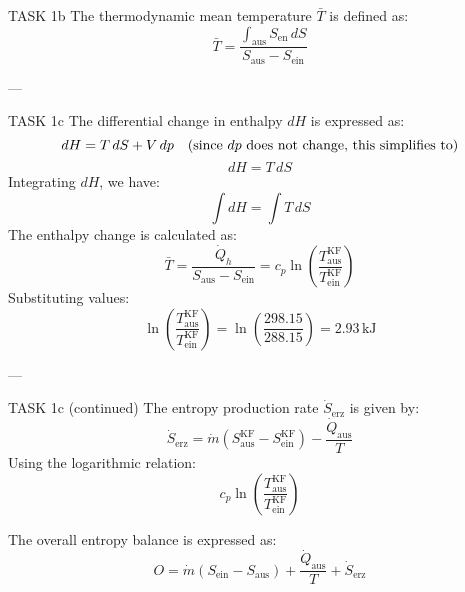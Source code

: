 TASK 1b  
The thermodynamic mean temperature \( \bar{T} \) is defined as:  
\[
\bar{T} = \frac{\int_{\text{aus}} S_{\text{en}} \, dS}{S_{\text{aus}} - S_{\text{ein}}}
\]

---

TASK 1c  
The differential change in enthalpy \( dH \) is expressed as:  
\[
dH = T \, dS + V \, dp \quad \text{(since \( dp \) does not change, this simplifies to)}
\]  
\[
dH = T \, dS
\]  
Integrating \( dH \), we have:  
\[
\int dH = \int T \, dS
\]  
The enthalpy change is calculated as:  
\[
\bar{T} = \frac{\dot{Q}_h}{S_{\text{aus}} - S_{\text{ein}}} = c_p \ln \left( \frac{T_{\text{aus}}^{\text{KF}}}{T_{\text{ein}}^{\text{KF}}} \right)
\]  
Substituting values:  
\[
\ln \left( \frac{T_{\text{aus}}^{\text{KF}}}{T_{\text{ein}}^{\text{KF}}} \right) = \ln \left( \frac{298.15}{288.15} \right) = 2.93 \, \text{kJ}
\]

---

TASK 1c (continued)  
The entropy production rate \( \dot{S}_{\text{erz}} \) is given by:  
\[
\dot{S}_{\text{erz}} = \dot{m} \left( S_{\text{aus}}^{\text{KF}} - S_{\text{ein}}^{\text{KF}} \right) - \frac{\dot{Q}_{\text{aus}}}{T}
\]  
Using the logarithmic relation:  
\[
c_p \ln \left( \frac{T_{\text{aus}}^{\text{KF}}}{T_{\text{ein}}^{\text{KF}}} \right)
\]

The overall entropy balance is expressed as:  
\[
O = \dot{m} \left( S_{\text{ein}} - S_{\text{aus}} \right) + \frac{\dot{Q}_{\text{aus}}}{T} + \dot{S}_{\text{erz}}
\]